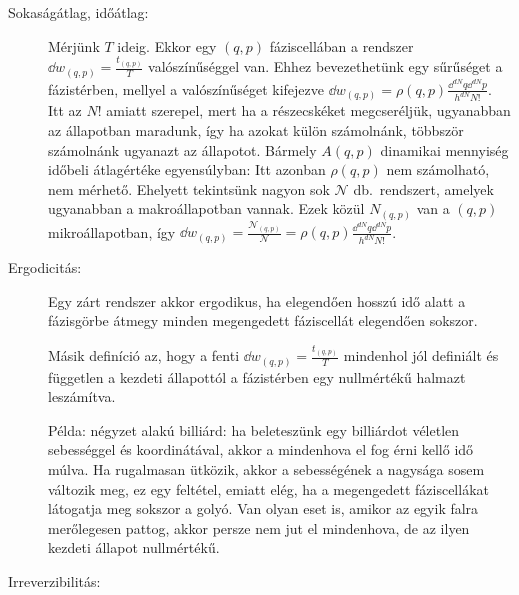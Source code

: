 \begin{description}
   \item[Sokaságátlag, időátlag:]
    
    Mérjünk $T$ ideig.
   Ekkor egy $(q,p)$ fáziscellában a rendszer $\dd w_{(q,p)}=\frac{t_{(q,p)}}{T}$ valószínűséggel van.
   Ehhez bevezethetünk egy sűrűséget a fázistérben, mellyel a valószínűséget kifejezve $\dd w_{(q,p)}=\rho(q,p)\frac{\dd^{dN}q\dd^{dN}p}{h^{dN}N!}$.
   Itt az $N!$ amiatt szerepel, mert ha a részecskéket megcseréljük, ugyanabban az állapotban maradunk, így ha azokat külön számolnánk, többször számolnánk ugyanazt az állapotot.
   Bármely $A(q,p)$ dinamikai mennyiség időbeli átlagértéke egyensúlyban:
    Itt azonban $\rho(q,p)$ nem számolható, nem mérhető.
   Ehelyett tekintsünk nagyon sok $\mathcal{N}$ db.\ rendszert, amelyek ugyanabban a makroállapotban vannak.
   Ezek közül $N_{(q,p)}$ van a $(q,p)$ mikroállapotban, így $\dd w_{(q,p)}=\frac{\mathcal{N}_{(q,p)}}{\mathcal{N}}=\rho(q,p)\frac{\dd^{dN}q\dd^{dN}p}{h^{dN}N!}$.
    
   \item[Ergodicitás:]
    
    Egy zárt rendszer akkor ergodikus, ha elegendően hosszú idő alatt a fázisgörbe átmegy minden megengedett fáziscellát elegendően sokszor.
    
    Másik definíció az, hogy a fenti $\dd w_{(q,p)}=\frac{t_{(q,p)}}{T}$ mindenhol jól definiált és független a kezdeti állapottól a fázistérben egy nullmértékű halmazt leszámítva. 
    
    Példa: négyzet alakú billiárd: ha beleteszünk egy billiárdot véletlen sebességgel és koordinátával, akkor a mindenhova el fog érni kellő idő múlva.
   Ha rugalmasan ütközik, akkor a sebességének a nagysága sosem változik meg, ez egy feltétel, emiatt elég, ha a megengedett fáziscellákat látogatja meg sokszor a golyó.
   Van olyan eset is, amikor az egyik falra merőlegesen pattog, akkor persze nem jut el mindenhova, de az ilyen kezdeti állapot nullmértékű.
    
   \item[Irreverzibilitás:]
    

\end{description}
